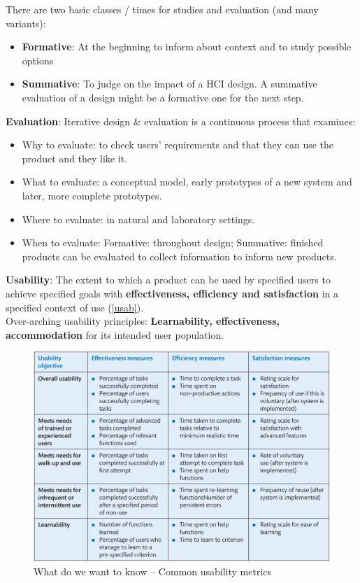 There are two basic classes / times for studies and evaluation (and many variants):
\begin{itemize}
\item \textbf{Formative}: At the beginning to inform about context and to study possible options
\item \textbf{Summative}: To judge on the impact of a HCI design.
A summative evaluation of a design might be a
formative one for the next step.
\end{itemize}
\textbf{Evaluation}: Iterative design \& evaluation is a continuous process that examines:
\begin{itemize}
\item Why to evaluate: to check users’ requirements and that they can use the product and they like it.
\item What to evaluate: a conceptual model, early prototypes of a new system and later, more complete prototypes.
\item Where to evaluate: in natural and laboratory settings.
\item When to evaluate: Formative: throughout design; Summative: finished products can be evaluated to collect information to inform new products.
\end{itemize}
\textbf{Usability}: The extent to which a product can be used by specified users to achieve specified goals with \textbf{effectiveness, efficiency and satisfaction} in a specified context of use (\autoref{usab}).\\
 Over-arching usability principles: \textbf{Learnability, effectiveness, accommodation} for its intended user population.\\
 \begin{figure}[h!]
			\centering
			\includegraphics[width=\textwidth]{img/ch01_usab.png}
			\caption{What do we want to know -- Common usability metrics}
			\label{usab}
		\end{figure} 
